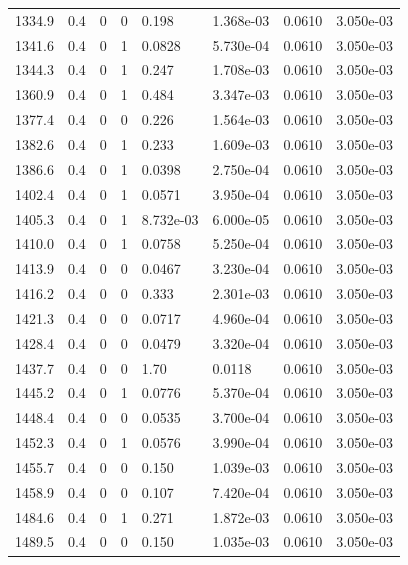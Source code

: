 \documentclass[preview]{standalone}
\begin{document}
{{{{{{{\begin{tabular}{L{1.2cm}C{1.2cm} C{0.3cm}C{0.5cm} C{1.4cm}C{1.4cm} C{1.4cm}C{1.4cm}}
  1334.9  &   0.4  & 0     &  0 &  0.198  & 1.368e-03  & 0.0610 &  3.050e-03   \\ 
  1341.6  &   0.4  & 0     &  1 &  0.0828  & 5.730e-04  & 0.0610 &  3.050e-03   \\ 
  1344.3  &   0.4  & 0     &  1 &  0.247  & 1.708e-03  & 0.0610 &  3.050e-03   \\ 
  1360.9  &   0.4  & 0     &  1 &  0.484  & 3.347e-03  & 0.0610 &  3.050e-03   \\ 
  1377.4  &   0.4  & 0     &  0 &  0.226  & 1.564e-03  & 0.0610 &  3.050e-03   \\ 
  1382.6  &   0.4  & 0     &  1 &  0.233  & 1.609e-03  & 0.0610 &  3.050e-03   \\ 
  1386.6  &   0.4  & 0     &  1 &  0.0398  & 2.750e-04  & 0.0610 &  3.050e-03   \\ 
  1402.4  &   0.4  & 0     &  1 &  0.0571  & 3.950e-04  & 0.0610 &  3.050e-03   \\ 
  1405.3  &   0.4  & 0     &  1 &  8.732e-03  & 6.000e-05  & 0.0610 &  3.050e-03   \\ 
  1410.0  &   0.4  & 0     &  1 &  0.0758  & 5.250e-04  & 0.0610 &  3.050e-03   \\ 
  1413.9  &   0.4  & 0     &  0 &  0.0467  & 3.230e-04  & 0.0610 &  3.050e-03   \\ 
  1416.2  &   0.4  & 0     &  0 &  0.333  & 2.301e-03  & 0.0610 &  3.050e-03   \\ 
  1421.3  &   0.4  & 0     &  0 &  0.0717  & 4.960e-04  & 0.0610 &  3.050e-03   \\ 
  1428.4  &   0.4  & 0     &  0 &  0.0479  & 3.320e-04  & 0.0610 &  3.050e-03   \\ 
  1437.7  &   0.4  & 0     &  0 &  1.70  & 0.0118  & 0.0610 &  3.050e-03   \\ 
  1445.2  &   0.4  & 0     &  1 &  0.0776  & 5.370e-04  & 0.0610 &  3.050e-03   \\ 
  1448.4  &   0.4  & 0     &  0 &  0.0535  & 3.700e-04  & 0.0610 &  3.050e-03   \\ 
  1452.3  &   0.4  & 0     &  1 &  0.0576  & 3.990e-04  & 0.0610 &  3.050e-03   \\ 
  1455.7  &   0.4  & 0     &  0 &  0.150  & 1.039e-03  & 0.0610 &  3.050e-03   \\ 
  1458.9  &   0.4  & 0     &  0 &  0.107  & 7.420e-04  & 0.0610 &  3.050e-03   \\ 
  1484.6  &   0.4  & 0     &  1 &  0.271  & 1.872e-03  & 0.0610 &  3.050e-03   \\ 
  1489.5  &   0.4  & 0     &  0 &  0.150  & 1.035e-03  & 0.0610 &  3.050e-03   \\ 

\end{tabular}}}}}}}}
\end{document}
